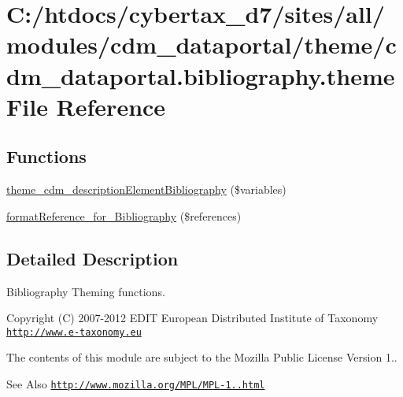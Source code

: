 \hypertarget{cdm__dataportal_8bibliography_8theme}{\section{C\-:/htdocs/cybertax\-\_\-d7/sites/all/modules/cdm\-\_\-dataportal/theme/cdm\-\_\-dataportal.bibliography.\-theme File Reference}
\label{cdm__dataportal_8bibliography_8theme}
}
\subsection*{Functions}
\begin{DoxyCompactItemize}
\item 
\hyperlink{cdm__dataportal_8bibliography_8theme_a3b90682082efdc6104c9b98baf2fac8a}{theme\-\_\-cdm\-\_\-description\-Element\-Bibliography} (\$variables)
\item 
\hyperlink{cdm__dataportal_8bibliography_8theme_ab5b351d4962395ea73e0b70070ac16e6}{format\-Reference\-\_\-for\-\_\-\-Bibliography} (\$references)
\end{DoxyCompactItemize}


\subsection{Detailed Description}
Bibliography Theming functions.

\begin{DoxyCopyright}{Copyright}
(C) 2007-\/2012 E\-D\-I\-T European Distributed Institute of Taxonomy \href{http://www.e-taxonomy.eu}{\tt http\-://www.\-e-\/taxonomy.\-eu}
\end{DoxyCopyright}
The contents of this module are subject to the Mozilla Public License Version 1.. \begin{DoxySeeAlso}{See Also}
\href{http://www.mozilla.org/MPL/MPL-1.1.html}{\tt http\-://www.\-mozilla.\-org/\-M\-P\-L/\-M\-P\-L-\/1..\-html} 
\end{DoxySeeAlso}


